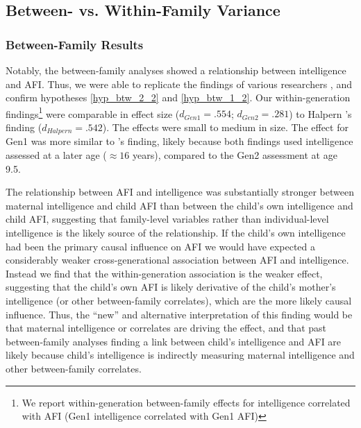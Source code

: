 \documentclass[a4paper,man,apacite,natbib,12pt,longtable]{apa6}\usepackage[]{graphicx}\usepackage[]{color}
\begin{document}
\subsection{Between- vs. Within-Family Variance}
\subsubsection{Between-Family Results} Notably, the between-family analyses showed a relationship between intelligence and AFI. Thus, we were able to replicate the findings of various researchers \citep{halpern2000smart,mott1983early,Paul2000,Woodward2001}, and confirm hypotheses \ref{hyp_btw_2_2} and \ref{hyp_btw_1_2}. Our within-generation findings\footnote{We report within-generation between-family effects for intelligence correlated with AFI (\eg Gen1 intelligence correlated with Gen1 AFI)} were comparable in effect size ($d_{Gen1} =.554$; $d_{Gen2} = .281$) to Halpern \et's \citeyear{halpern2000smart} finding ($d_{Halpern} = .542$). The effects were small to medium in size. The effect for Gen1 was more similar to \citet{halpern2000smart}'s finding, likely because both findings used intelligence assessed at a later age ($\approx 16$ years), compared to the Gen2 assessment at age 9.5.

The relationship between AFI and intelligence was substantially stronger between maternal intelligence and child AFI than between the child's own intelligence and child AFI, suggesting that family-level variables rather than individual-level intelligence is the likely source of the relationship. If the child's own intelligence had been the primary causal influence on AFI we would have expected a considerably weaker cross-generational association between AFI and intelligence. Instead we find that the within-generation association is the weaker effect, suggesting that the child's own AFI is likely derivative of the child's mother's intelligence (or other between-family correlates), which are the more likely causal influence. Thus, the ``new'' and alternative interpretation of this finding would be that maternal intelligence or correlates are driving the effect, and that past between-family analyses finding a link between child's intelligence and AFI are likely because child's intelligence is indirectly measuring maternal intelligence and other between-family correlates. 
\end{document}
